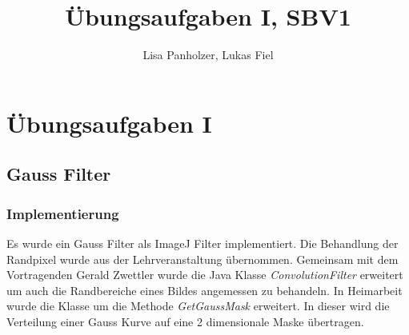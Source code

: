\documentclass[12pt,german]{article}
\begin{document}
\title{Übungsaufgaben I, SBV1 }
\author{Lisa Panholzer, Lukas Fiel}
\maketitle


\newpage
\section{Übungsaufgaben I}
\subsection{Gauss Filter}
\subsubsection{Implementierung}
\label{sec:Gausfilterimplementierung}
Es wurde ein Gauss Filter als ImageJ Filter implementiert. Die Behandlung der Randpixel wurde aus der Lehrveranstaltung übernommen. Gemeinsam mit dem Vortragenden Gerald Zwettler wurde die Java Klasse \textit{ConvolutionFilter} erweitert um auch die Randbereiche eines Bildes angemessen zu behandeln. In Heimarbeit wurde die Klasse um die Methode \textit{GetGaussMask} erweitert. In dieser wird die Verteilung einer Gauss Kurve auf eine 2 dimensionale Maske übertragen. \\



\end{document}
